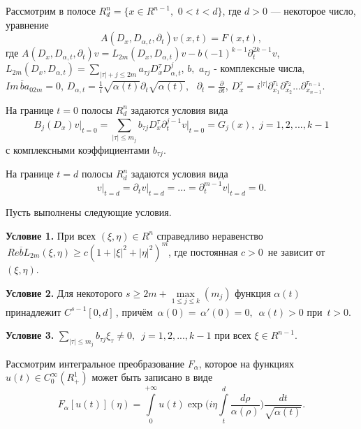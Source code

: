 Рассмотрим в полосе $R_d^n = \{x \in R^{n - 1},\,\,0 < t < d\}$, где $d >
0$ --- некоторое число, уравнение
\begin{equation}
\label{eq4500}
A(D_x ,D_{\alpha ,t} ,\partial _t )v(x,t) = F(x,t),
\end{equation}
где
$A(D_x ,D_{\alpha ,t} ,\partial _t )v = L_{2m} (D_x ,D_{\alpha ,t} )v -
b( - 1)^{k - 1}\partial _t^{2k - 1} v$,
\linebreak
$L_{2m} (D_x ,D_{\alpha ,t} ) =
\sum\limits_{\left| \tau \right| + j \le 2m} {a_{\tau j} D_x^\tau D_{\alpha
,t}^j } $, $b,\,\,a_{\tau j} $ - комплексные числа, $Im\,\overline b a_{02m}
= 0$, $D_{\alpha ,t} = \frac{1}{i}\sqrt {\alpha (t)} \partial _t \sqrt
{\alpha (t)} ,\,\,\,\,\partial _t = \frac{\partial }{\partial t}$, $D_x^\tau
= i^{\left| \tau \right|}\partial _{x_1 }^{\tau _1 } \partial _{x_2 }^{\tau
_2 } ...\partial _{x_{n - 1} }^{\tau _{n - 1} } $.

На границе $t = 0$ полосы $R_d^n $ задаются условия вида
\begin{equation}
\label{eq4501}
B_j (D_x )\left. v \right|_{t = 0} = \!\!\! \sum\limits_{\left| \tau \right| \le
m_j } {b_{\tau j} D_x^\tau \partial _t^{j - 1} \left. v \right|_{t = 0} =
G_j (x)} ,\,\,j = 1,2,...,k - 1
\end{equation}
с комплексными коэффициентами $b_{\tau j} $.

На границе $t = d$ полосы $R_d^n $ задаются условия вида
\begin{equation}
\label{eq4502}
\left. v \right|_{t = d} = \partial _t \left. v \right|_{t = d} = ... =
\partial _t^{m - 1} \left. v \right|_{t = d} = 0.
\end{equation}

Пусть выполнены следующие условия.

\textbf{Условие 1.} При всех $(\xi ,\eta ) \in R^n$ справедливо неравенство
$\,Re\overline b L_{2m} (\xi ,\eta ) \ge c(1 + \left| \xi \right|^2 + \left|
\eta \right|^2)^m$, где постоянная $c > 0\,$ не зависит от $(\xi ,\eta )$.

\textbf{Условие 2.} Для некоторого $s \ge 2m + \mathop {\max }\limits_{1 \le
j \le k} (m_j )$ функция $\alpha (t)$ принадлежит $C^{s - 1}[0,d]\,$, причём
$\,\alpha (0) = \,\alpha '(0) = 0,\,\,\,\alpha (t) > 0$ при $\,t > 0$.

\textbf{Условие 3.}
$\sum\limits_{\left| \tau \right| \le m_j } {b_{\tau
j} \xi _\tau \ne 0,\,\,} \,j = 1,2,...,k - 1$ при всех $\xi \in R^{n - 1}$.

Рассмотрим интегральное преобразование $F_\alpha $, которое на функциях
$u(t) \in C_0^\infty (R_ + ^1 )$ может быть записано в виде
\[
F_\alpha [u(t)](\eta ) = \int\limits_0^{ + \infty } {u(t)\exp (i\eta }
\int\limits_t^d {\frac{d\rho }{\alpha (\rho )}} )\frac{dt}{\sqrt {\alpha
(t)} }.
\]

